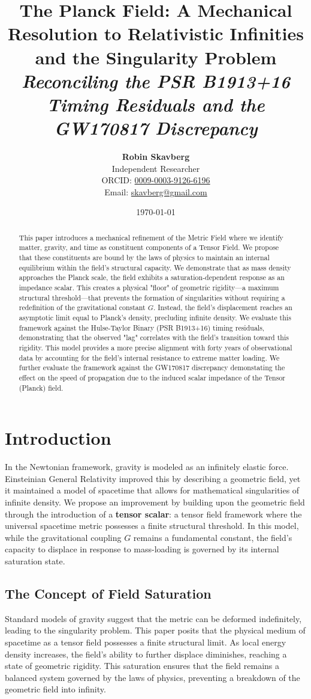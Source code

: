 \documentclass{article}
\title{
    \textbf{The Planck Field: A Mechanical Resolution to Relativistic Infinities and the Singularity Problem} \\
    \large \textit{Reconciling the PSR B1913+16 Timing Residuals and the GW170817 Discrepancy}
}
\author{
    \textbf{Robin Skavberg} \\
    \small Independent Researcher \\
    \small ORCID: \href{https://orcid.org/0009-0003-9126-6196}{0009-0003-9126-6196} \\
    \small Email: \href{mailto:skavberg@gmail.com}{skavberg@gmail.com}
}
\date{\today}
\begin{document}
\maketitle

\begin{abstract}
This paper introduces a mechanical refinement of the Metric Field where we identify matter, gravity, and time as constituent components of a Tensor Field. We propose that these constituents are bound by the laws of physics to maintain an internal equilibrium within the field's structural capacity. We demonstrate that as mass density approaches the Planck scale, the field exhibits a saturation-dependent response as an impedance scalar. This creates a physical "floor" of geometric rigidity—a maximum structural threshold—that prevents the formation of singularities without requiring a redefinition of the gravitational constant $G$. Instead, the field's displacement reaches an asymptotic limit equal to Planck's density, precluding infinite density. We evaluate this framework against the Hulse-Taylor Binary (PSR B1913+16) timing residuals, demonstrating that the observed "lag" correlates with the field’s transition toward this rigidity. This model provides a more precise alignment with forty years of observational data by accounting for the field's internal resistance to extreme matter loading. We further evaluate the framework against the GW170817 discrepancy demonstating the effect on the speed of propagation due to the induced scalar impedance of the Tensor (Planck) field.
\end{abstract}

\section{Introduction}
In the Newtonian framework, gravity is modeled as an infinitely elastic force. Einsteinian General Relativity \cite{Einstein1915} improved this by describing a geometric field, yet it maintained a model of spacetime that allows for mathematical singularities of infinite density. We propose an improvement by building upon the geometric field through the introduction of a \textbf{tensor scalar}: a tensor field framework where the universal spacetime metric possesses a finite structural threshold. In this model, while the gravitational coupling $G$ remains a fundamental constant, the field's capacity to displace in response to mass-loading is governed by its internal saturation state.

\subsection{The Concept of Field Saturation}
Standard models of gravity suggest that the metric can be deformed indefinitely, leading to the singularity problem. This paper posits that the physical medium of spacetime as a tensor field possesses a finite structural limit. As local energy density increases, the field’s ability to further displace diminishes, reaching a state of geometric rigidity. This saturation ensures that the field remains a balanced system governed by the laws of physics, preventing a breakdown of the geometric field into infinity.
\end{document}
